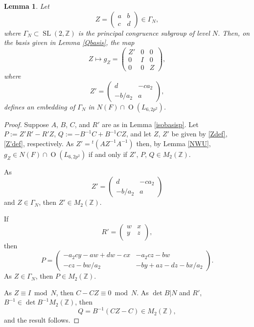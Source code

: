 \documentclass[11pt]{amsart}
\newtheorem{lem}[thm]{Lemma}
\newcommand{\ZZ}{\mathbb{Z}}
\newcommand{\opn}{\operatorname}
\begin{document}
\begin{lem}\label{Zlemma}
Let 
\begin{equation}\label{Zdef}
Z= 
\begin{pmatrix} 
a & b \\ 
c & d  
\end{pmatrix}
\in \Gamma_N,
\end{equation}
where $\Gamma_N \subset \opn{SL}(2, \ZZ)$ is the principal congruence subgroup of level $N$. 
Then, on the basis given in Lemma \ref{Qbasis}, the map
\begin{equation*}
Z \mapsto g_Z 
= 
\begin{pmatrix} 
Z' & 0 & 0 \\ 
0 & I & 0 \\ 
0 & 0 & Z 
\end{pmatrix},
\end{equation*}
where
\begin{equation}\label{Z'def}
Z' = 
\begin{pmatrix} 
d & -ca_2 \\ 
- b / a_2 & a 
\end{pmatrix},
\end{equation}
defines an embedding of $\Gamma_N$ in $N(F) \cap \opn{O}(L_{6,2p^2})$.
\end{lem} 
\begin{proof}
Suppose $A$, $B$, $C$, and $R'$ are as in Lemma \ref{isobasisp}.
Let  $P:=Z'R'-R'Z$, $Q:=-B^{-1}C + B^{-1}CZ$, and let $Z$, $Z'$ be given by \eqref{Zdef}, \eqref{Z'def}, respectively.
As $Z'={}^t(A Z^{-1} A^{-1})$ then, by Lemma \ref{NWU}, $g_Z \in N(F) \cap \opn{O}(L_{6,2p^2})$ if and only if $Z'$, $P$, $Q \in M_2(\ZZ)$.

As 
\begin{equation*}
Z' =
\begin{pmatrix}
d & -c a_2 \\
-b/a_2 & a 
\end{pmatrix}
\end{equation*}
and $Z \in \Gamma_N$, then $Z' \in M_2(\ZZ)$.

If 
\begin{equation*}
R' = 
\begin{pmatrix}
w & x \\
y & z \\
\end{pmatrix},
\end{equation*}
then
\begin{equation*}
P = 
\begin{pmatrix}
-a_2 c y - aw + dw - cx & -a_2cz - bw \\
-cz - bw/a_2 & -by + az - dz - bx/a_2 
\end{pmatrix}.
\end{equation*}
As $Z \in \Gamma_N$, then $P \in M_2(\ZZ)$.

As $Z \equiv I \bmod{N}$, then $C - CZ \equiv 0 \bmod{N}$.
As $\opn{det}B \vert N$ and $R'$, $B^{-1} \in \opn{det} B^{-1} M_2(\ZZ)$,  then
\begin{equation*}
Q = B^{-1} (CZ - C) \in M_2(\ZZ),
\end{equation*}
and the result follows.
\end{proof}
\end{document}
